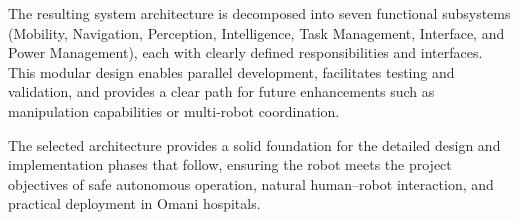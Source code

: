 The resulting system architecture is decomposed into seven functional subsystems (Mobility, Navigation, Perception, Intelligence, Task Management, Interface, and Power Management), each with clearly defined responsibilities and interfaces. This modular design enables parallel development, facilitates testing and validation, and provides a clear path for future enhancements such as manipulation capabilities or multi-robot coordination.

The selected architecture provides a solid foundation for the detailed design and implementation phases that follow, ensuring the robot meets the project objectives of safe autonomous operation, natural human--robot interaction, and practical deployment in Omani hospitals.

\clearpage